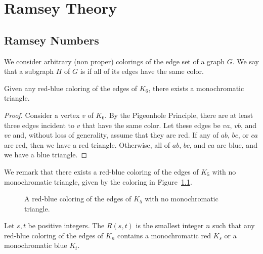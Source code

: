 \chapter{Ramsey Theory}

\section{Ramsey Numbers}

We consider arbitrary (non proper) colorings of the edge set of a graph \(G\).
We say that a subgraph \(H\) of \(G\) is  if all of its edges have the same color.

\begin{proposition} \label{prop:k6-monochromatic-triangle}
    Given any red-blue coloring of the edges of \(K_6\),
    there exists a monochromatic triangle.
\end{proposition}

\begin{proof}
    Consider a vertex \(v\) of \(K_6\).
    By the Pigeonhole Principle, there are at least three edges incident to \(v\) that have the same color.
    Let these edges be \(va\), \(vb\), and \(vc\) and, without loss of generality, assume that they are red.
    If any of \(ab\), \(bc\), or \(ca\) are red, then we have a red triangle.
    Otherwise, all of \(ab\), \(bc\), and \(ca\) are blue, and we have a blue triangle.
\end{proof}

We remark that there exists a red-blue coloring of the edges of \(K_5\) with no monochromatic triangle,
given by the coloring in Figure~\ref{fig:red-blue-coloring-k5}.

\begin{figure}[htbp]
    \centering
    \caption{A red-blue coloring of the edges of \(K_5\) with no monochromatic triangle.}
    \label{fig:red-blue-coloring-k5}
\end{figure}

\begin{definition}
    Let \(s, t\) be positive integers.
    The  \(R(s, t)\) is the smallest integer \(n\) such that any red-blue coloring of the edges of \(K_n\) contains
    a monochromatic red \(K_s\) or a monochromatic blue \(K_t\).
\end{definition}

